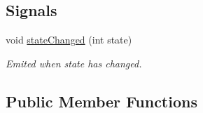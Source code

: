 \subsection*{Signals}
\begin{DoxyCompactItemize}
\item 
\hypertarget{classmdt_device_aecd2d9d2cc3665f2084d0fd20eb3db2d}{
void \hyperlink{classmdt_device_aecd2d9d2cc3665f2084d0fd20eb3db2d}{stateChanged} (int state)}
\label{classmdt_device_aecd2d9d2cc3665f2084d0fd20eb3db2d}

\begin{DoxyCompactList}\small\item\em Emited when state has changed. \end{DoxyCompactList}\end{DoxyCompactItemize}
\subsection*{Public Member Functions}
